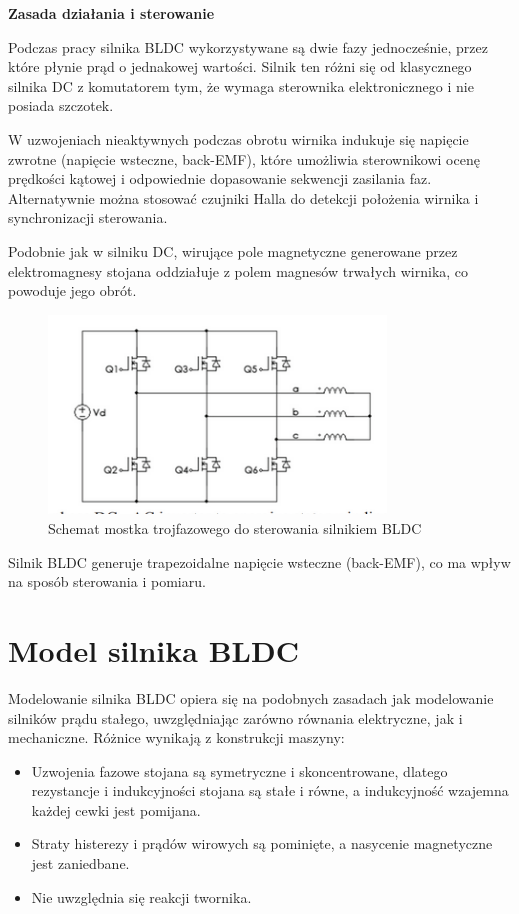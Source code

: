 \documentclass[11pt]{article}
\begin{document}
\medskip
\noindent
\textbf{Zasada działania i sterowanie}

Podczas pracy silnika BLDC wykorzystywane są dwie fazy jednocześnie, przez które płynie prąd o jednakowej wartości. Silnik ten różni się od klasycznego silnika DC z komutatorem tym, że wymaga sterownika elektronicznego i nie posiada szczotek.

W uzwojeniach nieaktywnych podczas obrotu wirnika indukuje się napięcie zwrotne (napięcie wsteczne, back-EMF), które umożliwia sterownikowi ocenę prędkości kątowej i odpowiednie dopasowanie sekwencji zasilania faz. Alternatywnie można stosować czujniki Halla do detekcji położenia wirnika i synchronizacji sterowania.

Podobnie jak w silniku DC, wirujące pole magnetyczne generowane przez elektromagnesy stojana oddziałuje z polem magnesów trwałych wirnika, co powoduje jego obrót.

\begin{figure}[H]
\centering
\includegraphics[width=0.8\textwidth]{aun2_3phase_bridge.png}
\caption{Schemat mostka trojfazowego do sterowania silnikiem BLDC}
\end{figure}

\medskip
\noindent
Silnik BLDC generuje trapezoidalne napięcie wsteczne (back-EMF), co ma wpływ na sposób sterowania i pomiaru.

\section*{Model silnika BLDC}

Modelowanie silnika BLDC opiera się na podobnych zasadach jak modelowanie silników prądu stałego, uwzględniając zarówno równania elektryczne, jak i mechaniczne. Różnice wynikają z konstrukcji maszyny:

\begin{itemize}
    \item Uzwojenia fazowe stojana są symetryczne i skoncentrowane, dlatego rezystancje i indukcyjności stojana są stałe i równe, a indukcyjność wzajemna każdej cewki jest pomijana.
    \item Straty histerezy i prądów wirowych są pominięte, a nasycenie magnetyczne jest zaniedbane.
    \item Nie uwzględnia się reakcji twornika.
\end{itemize}
\end{document}

